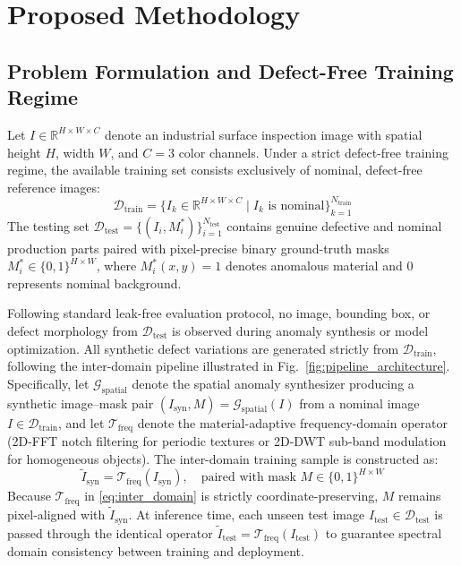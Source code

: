 \section{Proposed Methodology}
\label{sec:methodology}

\subsection{Problem Formulation and Defect-Free Training Regime}
Let $I \in \mathbb{R}^{H \times W \times C}$ denote an industrial surface inspection image with spatial height $H$, width $W$, and $C=3$ color channels. Under a strict defect-free training regime, the available training set consists exclusively of nominal, defect-free reference images:
\begin{equation}
\mathcal{D}_{\text{train}} = \{I_k \in \mathbb{R}^{H \times W \times C} \mid I_k \text{ is nominal}\}_{k=1}^{N_{\text{train}}}
\end{equation}
The testing set $\mathcal{D}_{\text{test}} = \{(I_i, M_i^*)\}_{i=1}^{N_{\text{test}}}$ contains genuine defective and nominal production parts paired with pixel-precise binary ground-truth masks $M_i^* \in \{0, 1\}^{H \times W}$, where $M_i^*(x, y) = 1$ denotes anomalous material and $0$ represents nominal background.

Following standard leak-free evaluation protocol, no image, bounding box, or defect morphology from $\mathcal{D}_{\text{test}}$ is observed during anomaly synthesis or model optimization. All synthetic defect variations are generated strictly from $\mathcal{D}_{\text{train}}$, following the inter-domain pipeline illustrated in Fig.~\ref{fig:pipeline_architecture}. Specifically, let $\mathcal{G}_{\text{spatial}}$ denote the spatial anomaly synthesizer producing a synthetic image--mask pair $(I_{\text{syn}}, M) = \mathcal{G}_{\text{spatial}}(I)$ from a nominal image $I \in \mathcal{D}_{\text{train}}$, and let $\mathcal{T}_{\text{freq}}$ denote the material-adaptive frequency-domain operator (2D-FFT notch filtering for periodic textures or 2D-DWT sub-band modulation for homogeneous objects). The inter-domain training sample is constructed as:
\begin{equation}
\label{eq:inter_domain}
\tilde{I}_{\text{syn}} = \mathcal{T}_{\text{freq}}\!\left(I_{\text{syn}}\right), \quad \text{paired with mask } M \in \{0, 1\}^{H \times W}
\end{equation}
Because $\mathcal{T}_{\text{freq}}$ in \eqref{eq:inter_domain} is strictly coordinate-preserving, $M$ remains pixel-aligned with $\tilde{I}_{\text{syn}}$. At inference time, each unseen test image $I_{\text{test}} \in \mathcal{D}_{\text{test}}$ is passed through the identical operator $\tilde{I}_{\text{test}} = \mathcal{T}_{\text{freq}}(I_{\text{test}})$ to guarantee spectral domain consistency between training and deployment.

